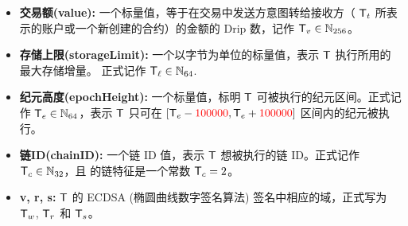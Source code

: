 \begin{itemize} [nosep]
	\item {\bf 交易额(value):} 一个标量值，等于在交易中发送方意图转给接收方（ $\textsf{T}_t$ 所表示的账户或一个新创建的合约）的金额的 Drip 数，记作  $\textsf{T}_v\in\mathbb{N}_{256}$。


	\item {\bf 存储上限(storageLimit):} 
	一个以字节为单位的标量值，表示 $\textsf{T}$ 执行所用的最大存储增量。
	正式记作 $\textsf{T}_{\ell}\in\mathbb{N}_{64}$.

	\item {\bf 纪元高度(epochHeight):} 
	一个标量值，标明 $\textsf{T}$ 可被执行的纪元区间。正式记作 $\textsf{T}_e\in\mathbb{N}_{64}$，表示 $\textsf{T}$ 只可在 $[\textsf{T}_e - {\color{red}100000}, \textsf{T}_e + {\color{red}100000}]$ 区间内的纪元被执行。

	\item {\bf 链ID(chainID):} 
	一个链 ID 值，表示 $\textsf{T}$ 想被执行的链 ID。正式记作 $\textsf{T}_c\in\mathbb{N}_{32}$，且 {\name} 的链特征是一个常数 $\textsf{T}_c=2$。

	\item {\bf v, r, s:} 
	$\textsf{T}$ 的 ECDSA (椭圆曲线数字签名算法) 签名中相应的域，正式写为 $\textsf{T}_w$, $\textsf{T}_r$ 和 $\textsf{T}_s$。 
\end{itemize}

